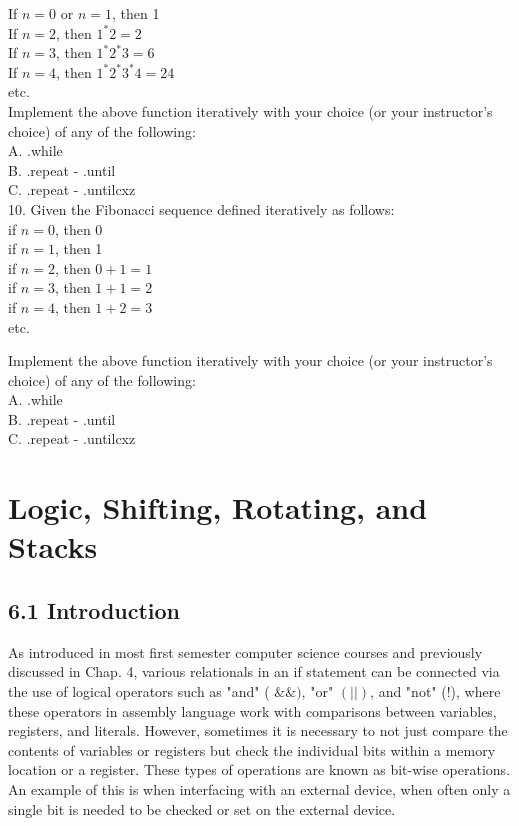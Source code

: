 \documentclass[10pt]{article}
\begin{document}
If $n=0$ or $n=1$, then 1\\
If $n=2$, then $1^{*} 2=2$\\
If $n=3$, then $1^{*} 2^{*} 3=6$\\
If $n=4$, then $1^{*} 2^{*} 3^{*} 4=24$\\
etc.\\
Implement the above function iteratively with your choice (or your instructor's choice) of any of the following:\\
A. .while\\
B. .repeat - .until\\
C. .repeat - .untilcxz\\
10. Given the Fibonacci sequence defined iteratively as follows:\\
if $n=0$, then 0\\
if $n=1$, then 1\\
if $n=2$, then $0+1=1$\\
if $n=3$, then $1+1=2$\\
if $n=4$, then $1+2=3$\\
etc.

Implement the above function iteratively with your choice (or your instructor's choice) of any of the following:\\
A. .while\\
B. .repeat - .until\\
C. .repeat - .untilcxz

\section*{Logic, Shifting, Rotating, and Stacks}
\subsection*{6.1 Introduction}
As introduced in most first semester computer science courses and previously discussed in Chap. 4, various relationals in an if statement can be connected via the use of logical operators such as "and" ( $\& \&)$, "or" $(|\mid)$, and "not" (!), where these operators in assembly language work with comparisons between variables, registers, and literals. However, sometimes it is necessary to not just compare the contents of variables or registers but check the individual bits within a memory location or a register. These types of operations are known as bit-wise operations. An example of this is when interfacing with an external device, when often only a single bit is needed to be checked or set on the external device.
\end{document}
